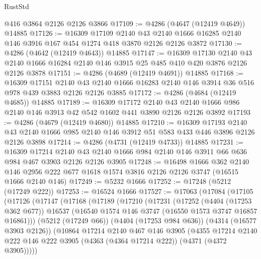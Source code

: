 \begin{lexlean}{RustStd}
\begin{coremodule}
    @416
    @3864
    @2126
    @2126
    @3866
@17109 := @4286 (@4647 (@12419 @4649)) @14885
@17126 := @16309
    @17109
    @2140
    @43
    @2140
    @1666
    @16285
    @2140
    @146
    @3916
    @167
    @454
    @1274
    @418
    @3870
    @2126
    @2126
    @3872
@17130 := @4286 (@4642 (@12419 @4643)) @14885
@17147 := @16309
    @17130
    @2140
    @43
    @2140
    @1666
    @16284
    @2140
    @146
    @3915
    @25
    @485
    @410
    @420
    @3876
    @2126
    @2126
    @3878
@17151 := @4286 (@4689 (@12419 @4691)) @14885
@17168 := @16309
    @17151
    @2140
    @43
    @2140
    @1666
    @16283
    @2140
    @146
    @3914
    @36
    @516
    @978
    @439
    @3883
    @2126
    @2126
    @3885
@17172 := @4286 (@4684 (@12419 @4685)) @14885
@17189 := @16309
    @17172
    @2140
    @43
    @2140
    @1666
    @986
    @2140
    @146
    @3913
    @42
    @542
    @1602
    @441
    @3890
    @2126
    @2126
    @3892
@17193 := @4286 (@4679 (@12419 @4680)) @14885
@17210 := @16309
    @17193
    @2140
    @43
    @2140
    @1666
    @985
    @2140
    @146
    @3912
    @51
    @583
    @433
    @446
    @3896
    @2126
    @2126
    @3898
@17214 := @4286 (@4731 (@12419 @4733)) @14885
@17231 := @16309
    @17214
    @2140
    @43
    @2140
    @1666
    @984
    @2140
    @146
    @3911
    @66
    @636
    @984
    @467
    @3903
    @2126
    @2126
    @3905
@17248 := @16498
    @1666
    @362
    @2140
    @146
    @2956
    @222
    @677
    @1618
    @1574
    @3816
    @2126
    @2126
    @3747
    (@16515 @1666 @2140 @146)
@17249 := @5232 @1666
@17252 := @17248 (@5212 (@17249 @222))
@17253 := @16524 @1666
@17527 := @17063
    (@17084
      (@17105
        (@17126
          (@17147
            (@17168
              (@17189
                (@17210
                  (@17231
                    (@17252
                      (@4404 (@17253 @362 @677))
                      @16537
                      (@16540 @1574 @146 @3747 (@16550 @1573 @3747 @16857 @16861)))
                    (@5212 (@17249 @66))
                    (@4404 (@17253 @984 @636))
                    (@4314 (@16577 @3903 @2126))
                    (@10864
                      @17214
                      @2140
                      @467
                      @146
                      @3905
                      (@4355
                        @17214
                        @2140
                        @222
                        @146
                        @222
                        @3905
                        (@4363 (@4364 @17214 @222))
                        (@4371 (@4372 @3905)))))

\end{coremodule}
\end{lexlean}
